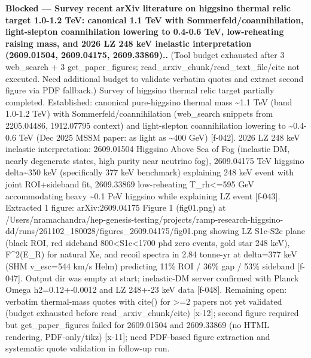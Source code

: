 \documentclass[11pt,a4paper]{article}
\begin{document}
\textbf{Blocked --- Survey recent arXiv literature on higgsino thermal relic target 1.0-1.2 TeV: canonical 1.1 TeV with Sommerfeld/coannihilation, light-slepton coannihilation lowering to 0.4-0.6 TeV, low-reheating raising mass, and 2026 LZ 248 keV inelastic interpretation (2609.01504, 2609.04175, 2609.33869)..} (Tool budget exhausted after 3 web\_search + 3 get\_paper\_figures; read\_arxiv\_chunk/read\_text\_file/cite not executed. Need additional budget to validate verbatim quotes and extract second figure via PDF fallback.) Survey of higgsino thermal relic target partially completed. Established: canonical pure-higgsino thermal mass \textasciitilde{}1.1 TeV (band 1.0-1.2 TeV) with Sommerfeld/coannihilation (web\_search snippets from 2205.04486, 1912.07795 context) and light-slepton coannihilation lowering to \textasciitilde{}0.4-0.6 TeV (Dec 2025 MSSM paper: as light as \textasciitilde{}400 GeV) [f-042]. 2026 LZ 248 keV inelastic interpretation: 2609.01504 Higgsino Above Sea of Fog (inelastic DM, nearly degenerate states, high purity near neutrino fog), 2609.04175 TeV higgsino delta\textasciitilde{}350 keV (specifically 377 keV benchmark) explaining 248 keV event with joint ROI+sideband fit, 2609.33869 low-reheating T\_rh\textless{}=595 GeV accommodating heavy \textasciitilde{}0.1 PeV higgsino while explaining LZ event [f-043]. Extracted 1 figure: arXiv:2609.04175 Figure 1 (fig01.png) at /Users/nramachandra/hep-genesis-testing/projects/ramp-research-higgsino-dd/runs/261102\_180028/figures\_2609.04175/fig01.png showing LZ S1c-S2c plane (black ROI, red sideband 800\textless{}S1c\textless{}1700 phd zero events, gold star 248 keV), F\textasciicircum{}2(E\_R) for natural Xe, and recoil spectra in 2.84 tonne-yr at delta=377 keV (SHM v\_esc=544 km/s Helm) predicting 11\% ROI / 36\% gap / 53\% sideband [f-047]. Output dir was empty at start; inelastic-DM server confirmed with Planck Omega h2=0.12+-0.0012 and LZ 248+-23 keV data [f-048]. Remaining open: verbatim thermal-mass quotes with cite() for \textgreater{}=2 papers not yet validated (budget exhausted before read\_arxiv\_chunk/cite) [x-12]; second figure required but get\_paper\_figures failed for 2609.01504 and 2609.33869 (no HTML rendering, PDF-only/tikz) [x-11]; need PDF-based figure extraction and systematic quote validation in follow-up run.
\end{document}

